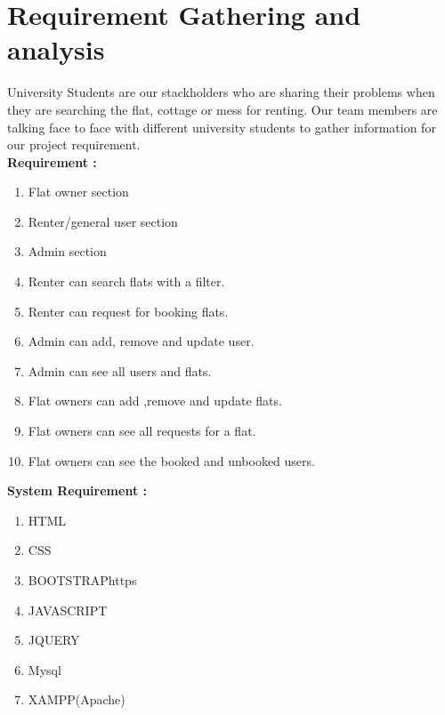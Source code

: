\section{Requirement Gathering and analysis}\label{sec:rga}
 University Students  are our stackholders who are sharing their problems when they are searching the flat, cottage or mess for renting.
Our team members are talking face to face with different university students 
 to gather information for our project requirement.\\
\textbf{Requirement : }
\begin{enumerate}
     

\item Flat owner section
\item Renter/general user section
\item Admin section
\item Renter can search flats with a filter.
\item Renter can request for booking flats.
\item Admin can add, remove and update user.
\item Admin can see all users and  flats.
\item Flat owners can add ,remove and update flats.
\item Flat owners can see all requests for a flat.
\item Flat owners can see  the booked and unbooked users.
\end{enumerate}
\textbf{System Requirement : }
\begin{enumerate}
    

\item HTML
\item CSS
\item BOOTSTRAPhttps 
\item JAVASCRIPT
\item JQUERY
\item Mysql
\item XAMPP(Apache) 
\end{enumerate}
\clearpage 